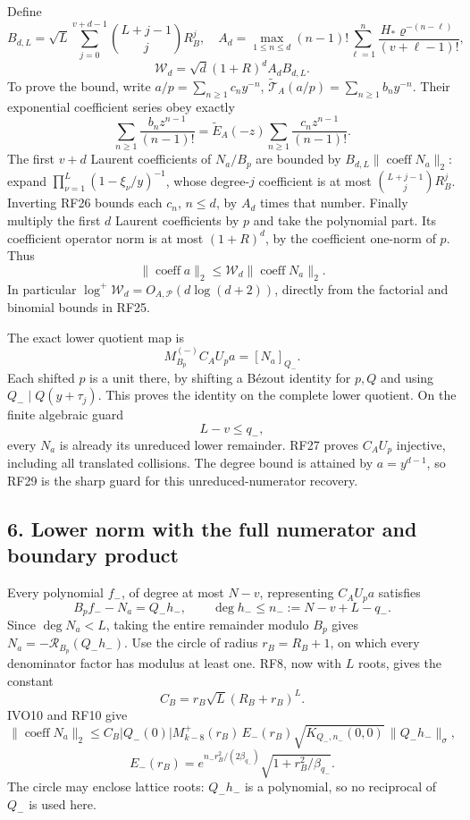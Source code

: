 \documentclass[11pt]{article}
\begin{document}
Define \[
B_{d,L}=\sqrt L\sum_{j=0}^{v+d-1}
 \binom{L+j-1}{j}R_B^j,\quad
A_d=\max_{1\le n\le d}(n-1)!
 \sum_{\ell=1}^n\frac{H_*\varrho^{-(n-\ell)}}{(v+\ell-1)!},
\] \[
\mathcal W_d=\sqrt d(1+R)^dA_dB_{d,L}.
\tag{RF25}
\] To prove the bound, write \(a/p=\sum_{n\ge1}c_ny^{-n}\), \(\widetilde{\mathcal T}_A(a/p)=\sum_{n\ge1}b_ny^{-n}\). Their exponential coefficient series obey exactly \[
\sum_{n\ge1}\frac{b_nz^{n-1}}{(n-1)!}
=\widetilde E_A(-z)\sum_{n\ge1}\frac{c_nz^{n-1}}{(n-1)!}.
\tag{RF26}
\] The first \(v+d\) Laurent coefficients of \(N_a/B_p\) are bounded by \(B_{d,L}\|\operatorname{coeff}N_a\|_2\): expand \(\prod_{\nu=1}^{L}(1-\xi_\nu/y)^{-1}\), whose degree-\(j\) coefficient is at most \(\binom{L+j-1}{j}R_B^j\). Inverting RF26 bounds each \(c_n\), \(n\le d\), by \(A_d\) times that number. Finally multiply the first \(d\) Laurent coefficients by \(p\) and take the polynomial part. Its coefficient operator norm is at most \((1+R)^d\), by the coefficient one-norm of \(p\). Thus \[
\|\operatorname{coeff}a\|_2
\le\mathcal W_d\|\operatorname{coeff}N_a\|_2.
\tag{RF27}
\] In particular \(\log^+\mathcal W_d=O_{A,\mathscr P}(d\log(d+2))\), directly from the factorial and binomial bounds in RF25.

The exact lower quotient map is \[
M_{B_p}^{(-)}C_AU_pa=[N_a]_{Q_-}.
\tag{RF28}
\] Each shifted \(p\) is a unit there, by shifting a Bézout identity for \(p,Q\) and using \(Q_-\mid Q(y+\tau_j)\). This proves the identity on the complete lower quotient. On the finite algebraic guard \[
L-v\le q_-,
\tag{RF29}
\] every \(N_a\) is already its unreduced lower remainder. RF27 proves \(C_AU_p\) injective, including all translated collisions. The degree bound is attained by \(a=y^{d-1}\), so RF29 is the sharp guard for this unreduced-numerator recovery.

\subsection{6. Lower norm with the full numerator and boundary product}\label{lower-norm-with-the-full-numerator-and-boundary-product}

Every polynomial \(f_-\), of degree at most \(N-v\), representing \(C_AU_pa\) satisfies \[
B_pf_--N_a=Q_-h_-,\qquad
\deg h_-\le n_-:=N-v+L-q_- .
\tag{RF30}
\] Since \(\deg N_a<L\), taking the entire remainder modulo \(B_p\) gives \(N_a=-\mathcal R_{B_p}(Q_-h_-)\). Use the circle of radius \(r_B=R_B+1\), on which every denominator factor has modulus at least one. RF8, now with \(L\) roots, gives the constant \[
C_B=r_B\sqrt L(R_B+r_B)^L.
\] IVO10 and RF10 give \[
\|\operatorname{coeff}N_a\|_2
\le C_B |Q_-(0)|M_{k-8}^+(r_B)\,
 E_-(r_B)\sqrt{K_{Q_-,n_-}(0,0)}\,\|Q_-h_-\|_\sigma,
\] \[
E_-(r_B)=
e^{n_-r_B^2/(2\beta_{q_-})}
\sqrt{1+r_B^2/\beta_{q_-}}.
\tag{RF31}
\] The circle may enclose lattice roots: \(Q_-h_-\) is a polynomial, so no reciprocal of \(Q_-\) is used here.
\end{document}
